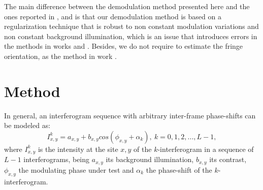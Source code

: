 \documentclass[letterpaper,12pt]{article}   %
\begin{document}
The main difference between the demodulation method presented here and the ones reported in  \cite{a14},\cite{a15} and \cite{a17} is that our demodulation method is based on a regularization technique that is robust to non constant modulation variations and non constant background illumination, which is an issue that introduces errors in the methods in works \cite{a14} and \cite{a15}. Besides, we do not require to estimate the fringe orientation, as the method in work \cite{a17}.


\section{Method}

In general, an interferogram sequence with arbitrary inter-frame phase-shifts can be modeled as: 
\begin{equation}\label{I_k1}
I_{x,y}^k=a_{x,y}+b_{x,y}cos(\phi_{x,y}+\alpha_k),\: k=0,1,2,...,L-1,
\end{equation}
where $I_{x,y}^k$ is the intensity at the site $x,y$ of the $k$-interferogram in a sequence of $L-1$ interferograms, being $a_{x,y}$ its background illumination, $b_{x,y}$ its contrast, $\phi_{x,y}$ the modulating phase under test and $\alpha_k$ the phase-shift of the $k$-interferogram.
\end{document}
